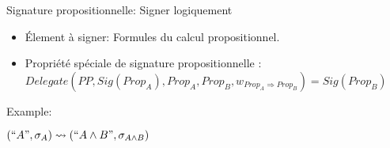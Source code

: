 \begin{frame}{Signature propositionnelle: Signer logiquement}
  \begin{itemize}
  \item \'Element \`a signer: Formules du calcul propositionnel.
  \item Propri\'et\'e sp\'eciale de signature propositionnelle : $Delegate(PP, Sig(Prop_A),Prop_A,Prop_B,w_{Prop_A \Rightarrow Prop_B}) = Sig(Prop_B)$
  \end{itemize}

  Example:

  $(``A", \sigma_{A}) \leadsto (``A\wedge B", \sigma_{A\wedge B})$ 
\end{frame}
